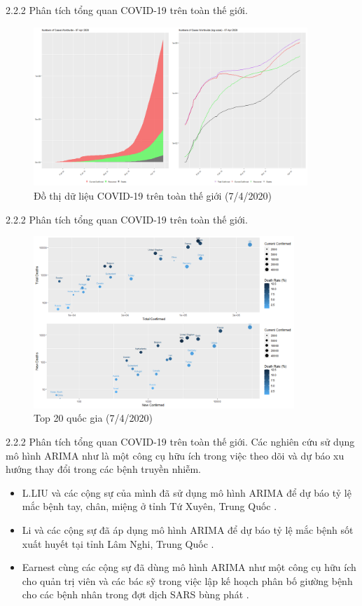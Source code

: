 \documentclass[notheorems,envcountsect,hyperref=unicode]{beamer}
\begin{document}
\begin{frame}{2.2.2 Phân tích tổng quan COVID-19 trên toàn thế giới.}
\begin{figure}[t]
	\centering
	\includegraphics[width=1\linewidth,height=6cm]{Rplot01}  
	\caption{Đồ thị dữ liệu COVID-19 trên toàn thế giới (7/4/2020)}
\end{figure}
\end{frame}

\begin{frame}{2.2.2 Phân tích tổng quan COVID-19 trên toàn thế giới.}
\begin{figure}[t]
	\centering
	\includegraphics[width=1\linewidth,height=6.5cm]{Rplot02}  
	\caption{Top 20 quốc gia (7/4/2020)}
\end{figure}
\end{frame}

\begin{frame}{2.2.2 Phân tích tổng quan COVID-19 trên toàn thế giới.}
Các nghiên cứu sử dụng mô hình ARIMA như là một công cụ hữu ích trong việc theo dõi và dự báo xu hướng thay đổi trong các bệnh truyền nhiễm.
\pause
\begin{itemize}
\item L.LIU và các cộng sự của mình đã sử dụng mô hình ARIMA để dự báo tỷ lệ mắc bệnh tay, chân, miệng ở tỉnh Tứ Xuyên, Trung Quốc \cite{10}.
\pause
\item Li và các cộng sự đã áp dụng mô hình ARIMA để dự báo tỷ lệ mắc bệnh sốt xuất huyết tại tỉnh Lâm Nghi, Trung Quốc \cite{11}.
\pause
\item Earnest cùng các cộng sự đã dùng mô hình ARIMA như một công cụ hữu ích cho quản trị viên và các bác sỹ trong việc lập kế hoạch phân bố giường bệnh cho các bệnh nhân trong đợt dịch SARS bùng phát \cite{12}.
\end{itemize}
\end{frame}
\end{document}
